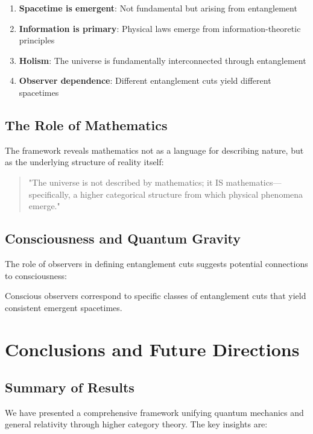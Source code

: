 \documentclass[12pt,a4paper]{article}
\theoremstyle{plain}
\theoremstyle{definition}
\theoremstyle{remark}
\begin{document}
\begin{enumerate}
\item \textbf{Spacetime is emergent}: Not fundamental but arising from entanglement
\item \textbf{Information is primary}: Physical laws emerge from information-theoretic principles
\item \textbf{Holism}: The universe is fundamentally interconnected through entanglement
\item \textbf{Observer dependence}: Different entanglement cuts yield different spacetimes
\end{enumerate}

\subsection{The Role of Mathematics}

The framework reveals mathematics not as a language for describing nature, but as the underlying structure of reality itself:

\begin{quote}
"The universe is not described by mathematics; it IS mathematics—specifically, a higher categorical structure from which physical phenomena emerge."
\end{quote}

\subsection{Consciousness and Quantum Gravity}

The role of observers in defining entanglement cuts suggests potential connections to consciousness:

\begin{conjecture}
Conscious observers correspond to specific classes of entanglement cuts that yield consistent emergent spacetimes.
\end{conjecture}

\section{Conclusions and Future Directions}

\subsection{Summary of Results}

We have presented a comprehensive framework unifying quantum mechanics and general relativity through higher category theory. The key insights are:
\end{document}
